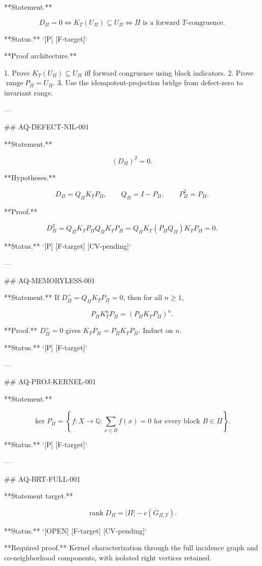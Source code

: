 **Statement.**

\[
D_\Pi=0
\Longleftrightarrow
K_T(U_\Pi)\subseteq U_\Pi
\Longleftrightarrow
\Pi\text{ is a forward }T\text{-congruence}.
\]

**Status.** `[P] [F-target]`

**Proof architecture.**

1. Prove \(K_T(U_\Pi)\subseteq U_\Pi\) iff forward congruence using
   block indicators.
2. Prove \(\operatorname{range}P_\Pi=U_\Pi\).
3. Use the idempotent-projection bridge from defect-zero to invariant range.

---

## AQ-DEFECT-NIL-001

**Statement.**

\[
(D_\Pi)^2=0.
\]

**Hypotheses.**

\[
D_\Pi=Q_\Pi K_TP_\Pi,\qquad
Q_\Pi=I-P_\Pi,\qquad
P_\Pi^2=P_\Pi.
\]

**Proof.**

\[
D_\Pi^2
=
Q_\Pi K_TP_\Pi Q_\Pi K_TP_\Pi
=
Q_\Pi K_T(P_\Pi Q_\Pi)K_TP_\Pi
=
0.
\]

**Status.** `[P] [F-target] [CV-pending]`

---

## AQ-MEMORYLESS-001

**Statement.** If \(D_\Pi^+=Q_\Pi K_TP_\Pi=0\), then for all \(n\ge1\),

\[
P_\Pi K_T^nP_\Pi
=
(P_\Pi K_TP_\Pi)^n.
\]

**Proof.** \(D_\Pi^+=0\) gives \(K_TP_\Pi=P_\Pi K_TP_\Pi\). Induct on \(n\).

**Status.** `[P] [F-target]`

---

## AQ-PROJ-KERNEL-001

**Statement.**

\[
\ker P_\Pi
=
\left\{
f:X\to\mathbb Q:
\sum_{x\in B}f(x)=0
\text{ for every block }B\in\Pi
\right\}.
\]

**Status.** `[P] [F-target]`

---

## AQ-BRT-FULL-001

**Statement target.**

\[
\operatorname{rank}D_\Pi
=
|\Pi|-c(G_{\Pi,T}).
\]

**Status.** `[OPEN] [F-target] [CV-pending]`

**Required proof.** Kernel characterization through the full incidence graph
and co-neighborhood components, with isolated right vertices retained.

